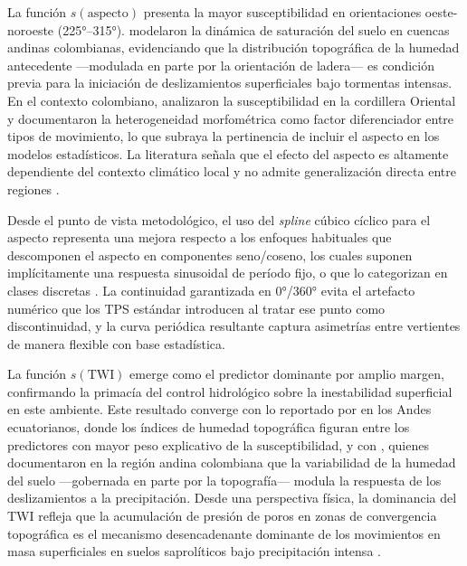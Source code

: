 \documentclass[12pt,a4paper]{article}
\begin{document}
La función $s(\text{aspecto})$ presenta la mayor susceptibilidad en orientaciones oeste-noroeste (225°--315°).
\citet{aristizabal2016shia} modelaron la dinámica de saturación del
suelo en cuencas andinas colombianas, evidenciando que la distribución
topográfica de la humedad antecedente —modulada en parte por la
orientación de ladera— es condición previa para la iniciación de
deslizamientos superficiales bajo tormentas intensas. En el contexto
colombiano, \citet{HerreraCoy2023} analizaron la susceptibilidad en
la cordillera Oriental y documentaron la heterogeneidad morfométrica
como factor diferenciador entre tipos de movimiento, lo que subraya
la pertinencia de incluir el aspecto en los modelos estadísticos. La
literatura señala que el efecto del aspecto es altamente dependiente
del contexto climático local y no admite generalización directa entre
regiones \citep{reichenbach2018review}.

Desde el punto de vista metodológico, el uso del \textit{spline} cúbico
cíclico para el aspecto representa una mejora respecto a los enfoques
habituales que descomponen el aspecto en componentes seno/coseno, los cuales suponen implícitamente una respuesta sinusoidal de período
fijo, o que lo categorizan en clases discretas
\citep{wilson2000terrain}. La continuidad garantizada en 0°/360° evita
el artefacto numérico que los TPS estándar introducen al tratar ese
punto como discontinuidad, y la curva periódica resultante captura
asimetrías entre vertientes de manera flexible con base estadística.

La función $s(\text{TWI})$ emerge como el predictor dominante por amplio margen,
confirmando la primacía del control hidrológico sobre la inestabilidad
superficial en este ambiente. Este resultado converge con lo reportado
por \citet{Munoz2023heliyon} en los Andes ecuatorianos, donde los
índices de humedad topográfica figuran entre los predictores con mayor
peso explicativo de la susceptibilidad, y con \citet{moralesvelez2024},
quienes documentaron en la región andina colombiana que la variabilidad
de la humedad del suelo —gobernada en parte por la topografía— modula
la respuesta de los deslizamientos a la precipitación. Desde una perspectiva física, la dominancia del TWI
refleja que la acumulación de presión de poros en zonas de convergencia
topográfica es el mecanismo desencadenante dominante de los movimientos
en masa superficiales en suelos saprolíticos bajo precipitación intensa
\citep{beven1979physically}.
\end{document}
